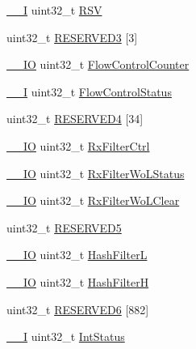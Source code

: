 \begin{DoxyCompactItemize}
\item 
\hyperlink{LPC17xx_8h_af63697ed9952cc71e1225efe205f6cd3}{\+\_\+\+\_\+I} uint32\+\_\+t \hyperlink{structLPC__EMAC__TypeDef_aa5b56072607b4bb97725a1d975e5238e}{R\+SV}
\item 
uint32\+\_\+t \hyperlink{structLPC__EMAC__TypeDef_a2e4c85d75b7f788af4487d21b1164654}{R\+E\+S\+E\+R\+V\+E\+D3} \mbox{[}3\mbox{]}
\item 
\hyperlink{LPC17xx_8h_aec43007d9998a0a0e01faede4133d6be}{\+\_\+\+\_\+\+IO} uint32\+\_\+t \hyperlink{structLPC__EMAC__TypeDef_aafb5ee27f72bcdc4bddcf3316cfa7fe2}{Flow\+Control\+Counter}
\item 
\hyperlink{LPC17xx_8h_af63697ed9952cc71e1225efe205f6cd3}{\+\_\+\+\_\+I} uint32\+\_\+t \hyperlink{structLPC__EMAC__TypeDef_aeaba186aa28630379a522ce9fcce07bc}{Flow\+Control\+Status}
\item 
uint32\+\_\+t \hyperlink{structLPC__EMAC__TypeDef_a7728a5be321ecf1e065d1747b970dd6f}{R\+E\+S\+E\+R\+V\+E\+D4} \mbox{[}34\mbox{]}
\item 
\hyperlink{LPC17xx_8h_aec43007d9998a0a0e01faede4133d6be}{\+\_\+\+\_\+\+IO} uint32\+\_\+t \hyperlink{structLPC__EMAC__TypeDef_aab1552a2d8a471a3fa7b24827cdd1cd4}{Rx\+Filter\+Ctrl}
\item 
\hyperlink{LPC17xx_8h_aec43007d9998a0a0e01faede4133d6be}{\+\_\+\+\_\+\+IO} uint32\+\_\+t \hyperlink{structLPC__EMAC__TypeDef_ac66f89acb20e270d4f39a1d9e18101d7}{Rx\+Filter\+Wo\+L\+Status}
\item 
\hyperlink{LPC17xx_8h_aec43007d9998a0a0e01faede4133d6be}{\+\_\+\+\_\+\+IO} uint32\+\_\+t \hyperlink{structLPC__EMAC__TypeDef_a2c399fd856451eb1eeb2f5584c51f0e6}{Rx\+Filter\+Wo\+L\+Clear}
\item 
uint32\+\_\+t \hyperlink{structLPC__EMAC__TypeDef_a88e7d8200edf2262d802d9bf72540e04}{R\+E\+S\+E\+R\+V\+E\+D5}
\item 
\hyperlink{LPC17xx_8h_aec43007d9998a0a0e01faede4133d6be}{\+\_\+\+\_\+\+IO} uint32\+\_\+t \hyperlink{structLPC__EMAC__TypeDef_a32834be73d125ac39cf2061c2d88d98b}{Hash\+FilterL}
\item 
\hyperlink{LPC17xx_8h_aec43007d9998a0a0e01faede4133d6be}{\+\_\+\+\_\+\+IO} uint32\+\_\+t \hyperlink{structLPC__EMAC__TypeDef_a1ef2410e1589f96115cc8213173824d6}{Hash\+FilterH}
\item 
uint32\+\_\+t \hyperlink{structLPC__EMAC__TypeDef_ac3167b43a414e404f8d79b96b692ef8b}{R\+E\+S\+E\+R\+V\+E\+D6} \mbox{[}882\mbox{]}
\item 
\hyperlink{LPC17xx_8h_af63697ed9952cc71e1225efe205f6cd3}{\+\_\+\+\_\+I} uint32\+\_\+t \hyperlink{structLPC__EMAC__TypeDef_aa2fa174ad6318c4352267f0d49ddce6a}{Int\+Status}

\end{DoxyCompactItemize}
